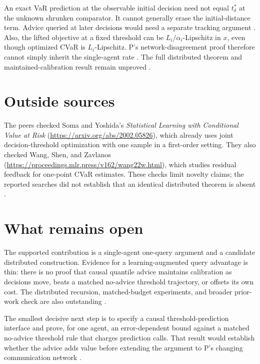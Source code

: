 \documentclass{article}
\begin{document}
An exact VaR prediction at the observable initial decision need not equal \(t_\delta^\ast\) at the unknown shrunken comparator. It cannot generally erase the initial-distance term. Advice queried at later decisions would need a separate tracking argument . Also, the lifted objective at a fixed threshold can be \(L_i/\alpha_i\)-Lipschitz in \(x\), even though optimized CVaR is \(L_i\)-Lipschitz. P's network-disagreement proof therefore cannot simply inherit the single-agent rate . The full distributed theorem and maintained-calibration result remain unproved .

\section{Outside sources}

The peers checked Soma and Yoshida's \emph{Statistical Learning with Conditional Value at Risk} (\url{https://arxiv.org/abs/2002.05826}), which already uses joint decision-threshold optimization with one sample in a first-order setting. They also checked Wang, Shen, and Zavlanos (\url{https://proceedings.mlr.press/v162/wang22w.html}), which studies residual feedback for one-point CVaR estimates. These checks limit novelty claims; the reported searches did not establish that an identical distributed theorem is absent .

\section{What remains open}

The supported contribution is a single-agent one-query argument and a candidate distributed construction. Evidence for a learning-augmented query advantage is thin: there is no proof that causal quantile advice maintains calibration as decisions move, beats a matched no-advice threshold trajectory, or offsets its own cost. The distributed recursion, matched-budget experiments, and broader prior-work check are also outstanding .

The smallest decisive next step is to specify a causal threshold-prediction interface and prove, for one agent, an error-dependent bound against a matched no-advice threshold rule that charges prediction calls. That result would establish whether the advice adds value before extending the argument to P's changing communication network .
\end{document}
